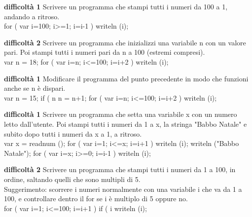 \documentclass{article}
\newenvironment{solution}{\verbatim}{\endverbatim}
\newenvironment{exercise}[3]{%
\noindent \textbf{\footnotesize difficoltà #2}
#3 \\
}{}
\begin{document}
\begin{exercise}{for}{1}{Scrivere un programma che stampi tutti i numeri da 100 a 1, andando a ritroso.}
\begin{solution}
for ( var i=100; i>=1; i=i-1 )
{
    writeln (i);
}
\end{solution}
\end{exercise}

\begin{exercise}{for}{2}{Scrivere un programma che inizializzi una variabile n con un valore pari. Poi stampi tutti i numeri pari da n a 100 (estremi compresi).}
\begin{solution}
var n = 18;
for ( var i=n; i<=100; i=i+2 )
{
    writeln (i);
}
\end{solution}
\end{exercise}

\begin{exercise}{for}{1}{Modificare il programma del punto precedente in modo che funzioni anche se n è dispari.}
\begin{solution}
var n = 15;
if ( n%
{
    n = n+1;
}
for ( var i=n; i<=100; i=i+2 )
{
    writeln (i);
}
\end{solution}
\end{exercise}

\begin{exercise}{for}{1}{Scrivere un programma che setta una variabile x con un numero letto dall'utente. Poi stampi tutti i numeri da 1 a x, la stringa "Babbo Natale" e subito dopo tutti i numeri da x a 1, a ritroso.}
\begin{solution}
var x = readnum ();
for ( var i=1; i<=x; i=i+1 )
{
    writeln (i);
}
writeln ("Babbo Natale");
for ( var i=x; i>=0; i=i-1 )
{
    writeln (i);
}
\end{solution}
\end{exercise}


\begin{exercise}{for}{2}{Scrivere un programma che stampi tutti i numeri da 1 a 100, in ordine, saltando quelli che sono multipli di 5.\\
    Suggerimento: scorrere i numeri normalmente con una variabile i che va da 1 a 100, e controllare dentro il for se i è multiplo di 5 oppure no.}
\begin{solution}
for ( var i=1; i<=100; i=i+1 )
{
    if ( i%
    {
        writeln (i);
    }
}
\end{solution}
\end{exercise}
\end{document}
